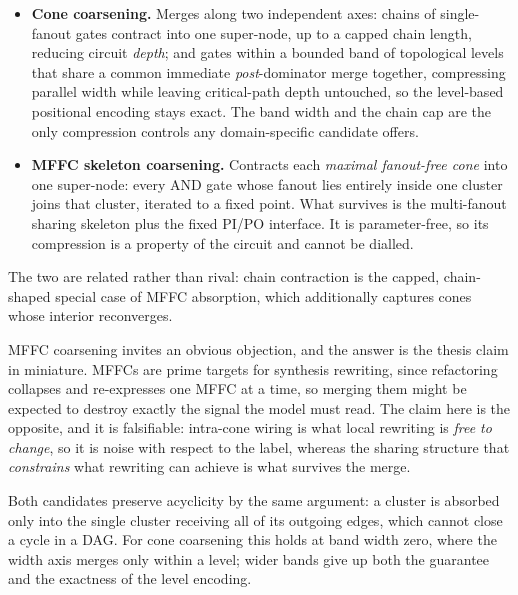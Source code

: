 \begin{itemize}
    \item \textbf{Cone coarsening.} Merges along two independent axes: chains of
    single-fanout gates contract into one super-node, up to a capped chain length, reducing
    circuit \emph{depth}; and gates within a bounded band of topological levels that share
    a common immediate \emph{post}-dominator merge together, compressing parallel width
    while leaving critical-path depth untouched, so the level-based positional encoding
    stays exact. The band width and the chain cap are the only compression controls any
    domain-specific candidate offers.
    \item \textbf{MFFC skeleton coarsening.} Contracts each \emph{maximal fanout-free cone}
    into one super-node: every AND gate whose fanout lies entirely inside one cluster joins
    that cluster, iterated to a fixed point. What survives is the multi-fanout sharing
    skeleton plus the fixed PI/PO interface. It is parameter-free, so its compression is a
    property of the circuit and cannot be dialled.
\end{itemize}

The two are related rather than rival: chain contraction is the capped, chain-shaped special
case of MFFC absorption, which additionally captures cones whose interior reconverges.

MFFC coarsening invites an obvious objection, and the answer is the thesis claim in
miniature. MFFCs are prime targets for synthesis rewriting, since refactoring collapses
and re-expresses one MFFC at a time, so merging them might be expected to destroy exactly
the signal the model must read. The claim here is the opposite, and it is falsifiable:
intra-cone wiring is what local rewriting is \emph{free to change}, so it is noise with
respect to the label, whereas the sharing structure that \emph{constrains} what rewriting can
achieve is what survives the merge.

Both candidates preserve acyclicity by the same argument: a cluster is absorbed only into the
single cluster receiving all of its outgoing edges, which cannot close a cycle in a DAG\@. For
cone coarsening this holds at band width zero, where the width axis merges only within a
level; wider bands give up both the guarantee and the exactness of the level encoding.



